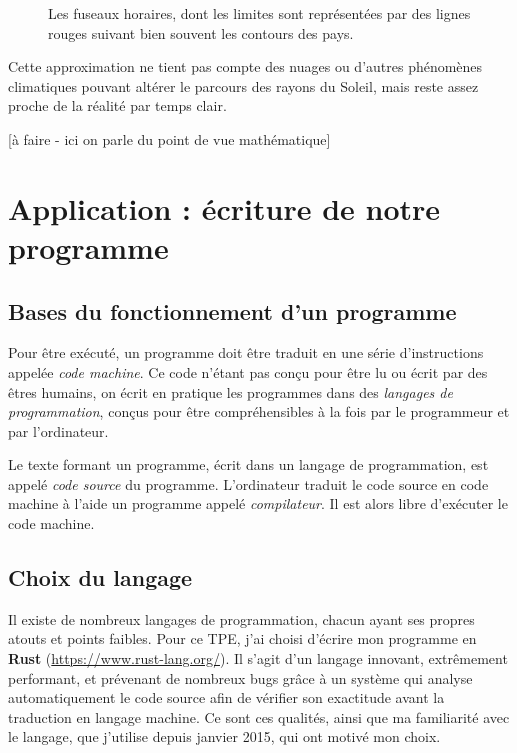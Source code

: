 \documentclass[12pt]{article}
\begin{document}
\begin{figure}[!ht]
  \centering
  \caption{Les fuseaux horaires, dont les limites sont représentées par des lignes rouges suivant bien souvent les contours des pays.}
  \label{fig:timezones}
\end{figure}

Cette approximation ne tient pas compte des nuages ou d'autres phénomènes climatiques pouvant altérer le parcours des rayons du Soleil, mais reste assez proche de la réalité par temps clair.

[à faire - ici on parle du point de vue mathématique]


\clearpage
\section{Application : écriture de notre programme}

\subsection{Bases du fonctionnement d'un programme}

Pour être exécuté, un programme doit être traduit en une série d'instructions appelée \textit{code machine}. Ce code n'étant pas conçu pour être lu ou écrit par des êtres humains, on écrit en pratique les programmes dans des \textit{langages de programmation}, conçus pour être compréhensibles à la fois par le programmeur et par l'ordinateur.

Le texte formant un programme, écrit dans un langage de programmation, est appelé \textit{code source} du programme. L'ordinateur traduit le code source en code machine à l'aide un programme appelé \textit{compilateur}. Il est alors libre d'exécuter le code machine.

\subsection{Choix du langage}
Il existe de nombreux langages de programmation, chacun ayant ses propres atouts et points faibles. Pour ce TPE, j'ai choisi d'écrire mon programme en \textbf{Rust} (\url{https://www.rust-lang.org/}). Il s'agit d'un langage innovant, extrêmement performant, et prévenant de nombreux bugs grâce à un système qui analyse automatiquement le code source afin de vérifier son exactitude avant la traduction en langage machine. Ce sont ces qualités, ainsi que ma familiarité avec le langage, que j'utilise depuis janvier 2015, qui ont motivé mon choix.
\end{document}
